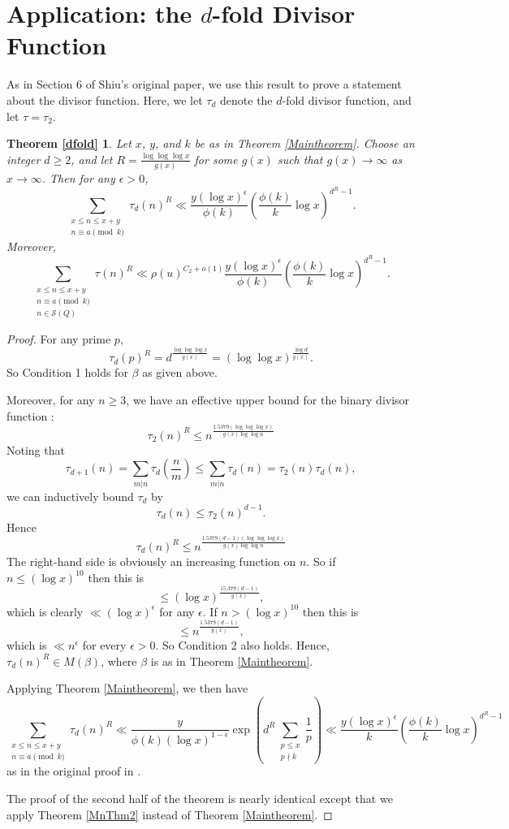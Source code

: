 \documentclass{amsart}
\newtheorem*{varthmdfold}{Theorem {\ref{dfold}}}
\begin{document}
\section{Application: the $d$-fold Divisor Function}
As in Section 6 of Shiu's original paper, we use this result to prove a statement about the divisor function.  Here, we let $\tau_d$ denote the $d$-fold divisor function, and let $\tau=\tau_2$.
\begin{varthmdfold}
Let $x$, $y$, and $k$ be as in Theorem \ref{Maintheorem}.  Choose an integer $d\geq 2$, and let $R=\frac{\log\log\log x}{g(x)}$ for some $g(x)$ such that $g(x)\to\infty$ as $x\to\infty$.  Then for any $\epsilon>0$,
$$\sum_{\substack{x\leq n\leq x+y \\ n\equiv a\pmod k}}\tau_d(n)^{R}\ll \frac{y(\log x)^\epsilon}{\phi(k)}\left(\frac{\phi(k)}{k}\log x\right)^{d^{R}-1}.$$
Moreover,
$$\sum_{\substack{x\leq n\leq x+y \\ n\equiv a\pmod k \\ n\in \mathcal S(Q)}}\tau(n)^{R}\ll \rho(u)^{C_2+o(1)}\frac{y(\log x)^\epsilon}{\phi(k)}\left(\frac{\phi(k)}{k}\log x\right)^{d^{R}-1}.$$
\end{varthmdfold}
\begin{proof}
For any prime $p$,
$$\tau_d(p)^{R}=d^{\frac{\log\log\log x}{g(x)}}=(\log\log x)^{\frac{\log d}{g(x)}}.$$
So Condition 1 holds for $\beta$ as given above.

Moreover, for any $n\geq 3$, we have an effective upper bound for the binary divisor function \cite{NR}:
$$\tau_2(n)^{R}\leq n^{\frac{1.5379 (\log\log\log x)}{g(x)\log\log n}}$$
Noting that 
$$\tau_{d+1}(n)=\sum_{m|n}\tau_d\left(\frac nm\right)\leq \sum_{m|n}\tau_d(n)=\tau_2(n)\tau_d(n),$$
we can inductively bound $\tau_d$ by
$$\tau_d(n)\leq \tau_2(n)^{d-1}.$$
Hence
$$\tau_d(n)^{R}\leq n^{\frac{1.5379 (d-1)(\log\log\log x)}{g(x)\log\log n}}$$
The right-hand side is obviously an increasing function on $n$.  So if $n\leq (\log x)^{10}$ then this is 
$$\leq (\log x)^{\frac{15.379 (d-1)}{g(x)}},$$
which is clearly $\ll (\log x)^\epsilon$ for any $\epsilon$.  If $n>(\log x)^{10}$ then this is
$$\leq n^{\frac{1.5379  (d-1)}{g(x)}},$$
which is $\ll n^\epsilon$ for every $\epsilon>0$.  So Condition 2 also holds.  Hence, $\tau_d(n)^R\in M(\beta)$, where $\beta$ is as in Theorem \ref{Maintheorem}.

Applying Theorem \ref{Maintheorem}, we then have
$$\sum_{\substack{x\leq n\leq x+y \\ n\equiv a\pmod k}}\tau_d(n)^{R}\ll \frac{y}{\phi(k)(\log x)^{1-\epsilon}}\exp\left(d^R\sum_{\substack{p\leq x \\ p\nmid k}}\frac{1}{p}\right)\ll \frac{y(\log x)^\epsilon}{k} \left(\frac{\phi(k)}{k}\log x\right)^{d^{R}-1}$$
as in the original proof in \cite{Sh}.

The proof of the second half of the theorem is nearly identical except that we apply Theorem \ref{MnThm2} instead of Theorem \ref{Maintheorem}.

\end{proof}
\end{document}
